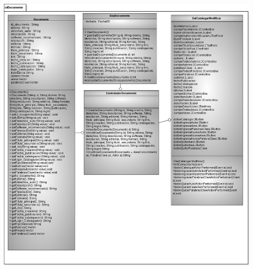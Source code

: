 \documentclass[11pt]{article}
\begin{document}
			\begin{minipage}[c]{1\linewidth}
				\centering
				\includegraphics[width=17cm, height=20cm]{DiagramasClase/Documentos}
			\end{minipage}	
		
\end{document}
